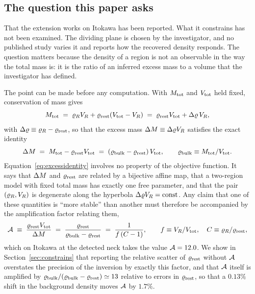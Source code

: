 \subsection{The question this paper asks}
\label{sec:intro:question}

That the extension works on Itokawa has been reported. What it
constrains has not been examined. The dividing plane is chosen by the
investigator, and no published study varies it and reports how the
recovered density responds. The question matters because the density of
a region is not an observable in the way the total mass is: it is the
ratio of an inferred excess mass to a volume that the investigator has
defined.

The point can be made before any computation. With $M_{\mathrm{tot}}$ and $V_{\mathrm{tot}}$
held fixed, conservation of mass gives
%
\begin{equation}
M_{\mathrm{tot}} \;=\; \varrho_{R}V_{R} + \varrho_{\mathrm{rest}}\!\left(V_{\mathrm{tot}}-V_{R}\right)
      \;=\; \varrho_{\mathrm{rest}}V_{\mathrm{tot}} + \Delta\varrho\,V_{R} ,
\label{eq:massbalance}
\end{equation}
%
with $\Delta\varrho\equiv\varrho_{R}-\varrho_{\mathrm{rest}}$, so that the excess mass
$\Delta M\equiv\Delta\varrho V_{R}$ satisfies the exact identity
%
\begin{equation}
\Delta M \;=\; M_{\mathrm{tot}}-\varrho_{\mathrm{rest}}V_{\mathrm{tot}}
       \;=\; \left(\varrho_{\mathrm{bulk}}-\varrho_{\mathrm{rest}}\right)V_{\mathrm{tot}} ,
\qquad \varrho_{\mathrm{bulk}}\equiv M_{\mathrm{tot}}/V_{\mathrm{tot}} .
\label{eq:excessidentity}
\end{equation}
%
Equation~\eqref{eq:excessidentity} involves no property of the objective
function. It says that $\Delta M$ and $\varrho_{\mathrm{rest}}$ are related by a
bijective affine map, that a two-region model with fixed total mass has
exactly one free parameter, and that the pair $(\varrho_{R},V_{R})$ is
degenerate along the hyperbola $\Delta\varrho V_{R}=\mathrm{const}$. Any claim
that one of these quantities is ``more stable'' than another must
therefore be accompanied by the amplification factor relating them,
%
\begin{equation}
\mathcal{A} \;\equiv\; \frac{\varrho_{\mathrm{rest}}V_{\mathrm{tot}}}{\Delta M}
        \;=\; \frac{\varrho_{\mathrm{rest}}}{\varrho_{\mathrm{bulk}}-\varrho_{\mathrm{rest}}}
        \;=\; \frac{1}{f\,(C-1)},
\qquad f\equiv V_{R}/V_{\mathrm{tot}},\quad C\equiv\varrho_{R}/\varrho_{\mathrm{rest}} ,
\label{eq:amplification}
\end{equation}
%
which on Itokawa at the detected neck takes the value
$\mathcal{A}=12.0$.
We show in Section~\ref{sec:constrains} that reporting the relative
scatter of $\varrho_{\mathrm{rest}}$ without $\mathcal{A}$ overstates the precision of the
inversion by exactly this factor, and that $\mathcal{A}$ itself is amplified
by $\varrho_{\mathrm{bulk}}/(\varrho_{\mathrm{bulk}}-\varrho_{\mathrm{rest}})\simeq13$ relative to errors in
$\varrho_{\mathrm{rest}}$, so that a $0.13\%$ shift in the background density moves
$\mathcal{A}$ by $1.7\%$.

